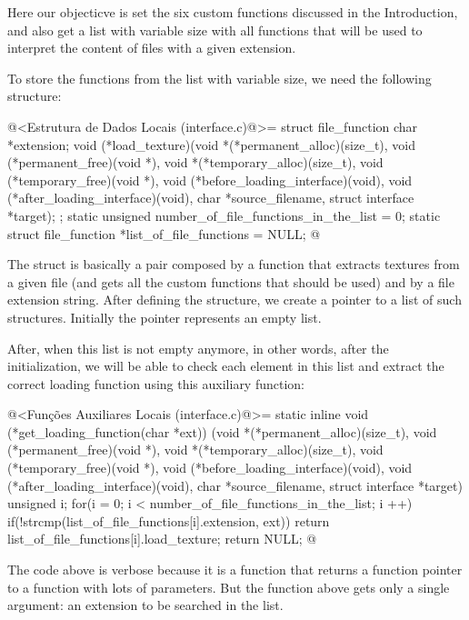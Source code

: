 
Here our objecticve is set the six custom functions discussed in the
Introduction, and also get a list with variable size with all
functions that will be used to interpret the content of files with a
given extension.

To store the functions from the list with variable size, we need the
following structure:

\iniciocodigo
@<Estrutura de Dados Locais (interface.c)@>=
struct file_function {
  char *extension;
  void (*load_texture)(void *(*permanent_alloc)(size_t),
                      void (*permanent_free)(void *),
                      void *(*temporary_alloc)(size_t),
                      void (*temporary_free)(void *),
                      void (*before_loading_interface)(void),
                      void (*after_loading_interface)(void),
                      char *source_filename, struct interface *target);
};
static unsigned number_of_file_functions_in_the_list = 0;
static struct file_function *list_of_file_functions = NULL;
@
\fimcodigo

The struct is basically a pair composed by a function that extracts
textures from a given file (and gets all the custom functions that
should be used) and by a file extension string. After defining the
structure, we create a pointer to a list of such structures. Initially
the pointer represents an empty list.

After, when this list is not empty anymore, in other words, after the
initialization, we will be able to check each element in this list and
extract the correct loading function using this auxiliary function:

\iniciocodigo
@<Funções Auxiliares Locais (interface.c)@>=
static inline void (*get_loading_function(char *ext))
                          (void *(*permanent_alloc)(size_t),
                           void (*permanent_free)(void *),
                           void *(*temporary_alloc)(size_t),
                           void (*temporary_free)(void *),
                           void (*before_loading_interface)(void),
                           void (*after_loading_interface)(void),
                           char *source_filename, struct interface *target){
  unsigned i;
  for(i = 0; i < number_of_file_functions_in_the_list; i ++){
    if(!strcmp(list_of_file_functions[i].extension, ext))
      return list_of_file_functions[i].load_texture;
  }
  return NULL;
}
@
\fimcodigo

The code above is verbose because it is a function that returns a
function pointer to a function with lots of parameters. But the
function above gets only a single argument: an extension to be
searched in the list.


